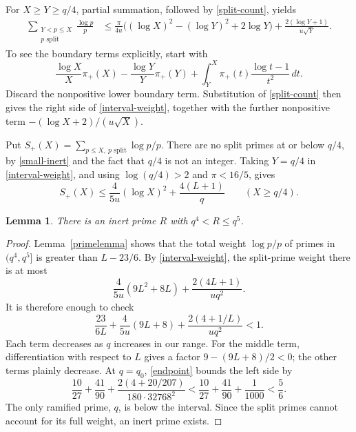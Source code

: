 \documentclass[11pt]{article}
\newtheorem{lemma}[theorem]{Lemma}
\begin{document}
For \(X\ge Y\ge q/4\), partial summation, followed by
\eqref{split-count}, yields
\begin{align}
 \sum_{\substack{Y<p\le X\\p\text{ split}}}\frac{\log p}{p}
 &\le\frac{\pi}{4u}
       \bigl((\log X)^2-(\log Y)^2+2\log Y\bigr)
       +\frac{2(\log Y+1)}{u\sqrt Y}.\label{interval-weight}
\end{align}
To see the boundary terms explicitly, start with
\[
 \frac{\log X}{X}\pi_+(X)-\frac{\log Y}{Y}\pi_+(Y)
 +\int_Y^X\pi_+(t)\frac{\log t-1}{t^2}\,dt.
\]
Discard the nonpositive lower boundary term. Substitution of
\eqref{split-count} then gives the right side of
\eqref{interval-weight}, together with the further nonpositive term
\(-(\log X+2)/(u\sqrt X)\).

Put \(S_+(X)=\sum_{p\le X,\ p\text{ split}}\log p/p\).
There are no split primes at or below \(q/4\), by
\eqref{small-inert} and the fact that \(q/4\) is not an integer.
Taking \(Y=q/4\) in \eqref{interval-weight}, and using
\(\log(q/4)>2\) and \(\pi<16/5\), gives
\begin{equation}\label{split-weight}
 S_+(X)\le\frac4{5u}(\log X)^2+\frac{4(L+1)}q
 \qquad(X\ge q/4).
\end{equation}

\begin{lemma}\label{auxiliary}
There is an inert prime \(R\) with \(q^4<R\le q^5\).
\end{lemma}
\begin{proof}
Lemma~\ref{primelemma} shows that the total weight \(\log p/p\)
of primes in \((q^4,q^5]\) is greater than \(L-23/6\).
By \eqref{interval-weight}, the split-prime weight there is at most
\[
 \frac4{5u}(9L^2+8L)+\frac{2(4L+1)}{u q^2}.
\]
It is therefore enough to check
\begin{equation}\label{aux-inequality}
 \frac{23}{6L}+\frac4{5u}(9L+8)
             +\frac{2(4+1/L)}{u q^2}<1.
\end{equation}
Each term decreases as \(q\) increases in our range. For the middle
term, differentiation with respect to \(L\) gives a factor
\(9-(9L+8)/2<0\); the other terms plainly decrease.
At \(q=q_0\), \eqref{endpoint} bounds the left side by
\[
 \frac{10}{27}+\frac{41}{90}
       +\frac{2(4+20/207)}{180\cdot32768^2}
 <\frac{10}{27}+\frac{41}{90}+\frac1{1000}<\frac56.
\]
The only ramified prime, \(q\), is below the interval. Since the
split primes cannot account for its full weight, an inert prime exists.
\end{proof}
\end{document}
